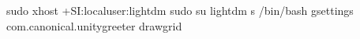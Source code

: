 sudo xhost +SI:localuser:lightdm
sudo su lightdm \PYZhy{}s /bin/bash
gsettings com.canonical.unity\PYZhy{}greeter draw\PYZhy{}grid 
